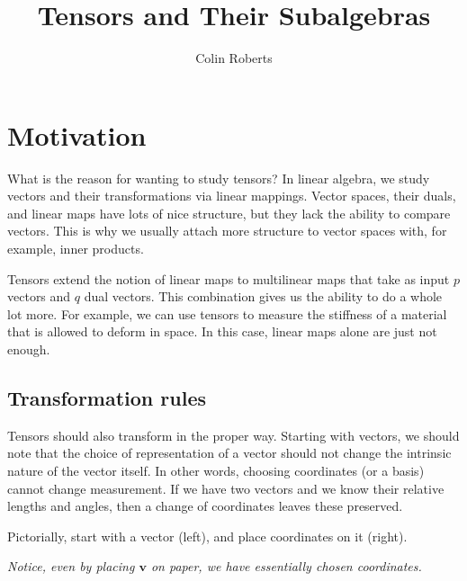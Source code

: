 \documentclass[12pt]{article}
\title{Tensors and Their Subalgebras}
\author{Colin Roberts}
\theoremstyle{definition}
\begin{document}
\maketitle

\section{Motivation}
What is the reason for wanting to study tensors?  In linear algebra, we study vectors and their transformations via linear mappings.  Vector spaces, their duals, and linear maps have lots of nice structure, but they lack the ability to compare vectors.  This is why we usually attach more structure to vector spaces with, for example, inner products.

Tensors extend the notion of linear maps to multilinear maps that take as input $p$ vectors and $q$ dual vectors.  This combination gives us the ability to do a whole lot more.  For example, we can use tensors to measure the stiffness of a material that is allowed to deform in space.  In this case, linear maps alone are just not enough.

\subsection{Transformation rules}
Tensors should also transform in the proper way.  Starting with vectors, we should note that the choice of representation of a vector should not change the intrinsic nature of the vector itself.  In other words, choosing coordinates (or a basis) cannot change measurement.  If we have two vectors and we know their relative lengths and angles, then a change of coordinates leaves these preserved.

Pictorially, start with a vector (left), and place coordinates on it (right).
        \begin{center}
        \hspace*{3cm}
        \end{center}
\emph{Notice, even by placing $\mathbf{v}$ on paper, we have essentially chosen coordinates.} 
\end{document}
